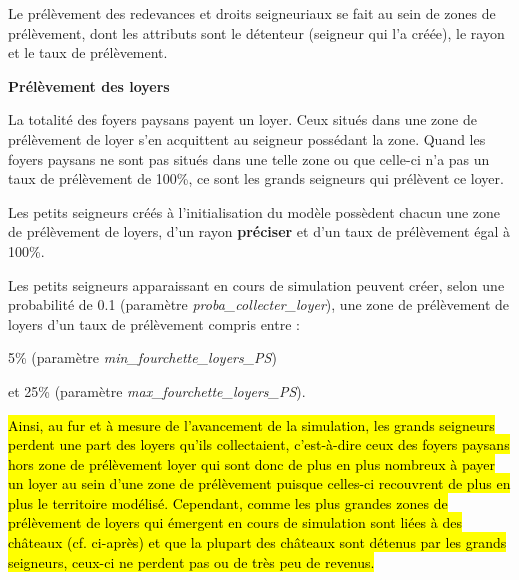 \documentclass[a4paper,11pt]{article}
\begin{document}
{Le prélèvement des redevances et droits seigneuriaux se fait au sein de zones de prélèvement, dont les attributs sont le détenteur (seigneur qui l'a créée), le rayon et le taux de prélèvement.

\bigskip
\textbf{Prélèvement des loyers}

La totalité des foyers paysans payent un loyer. Ceux situés dans une zone de prélèvement de loyer s'en acquittent au seigneur possédant la zone. Quand les foyers paysans ne sont pas situés dans une telle zone ou que celle-ci n'a pas un taux de prélèvement de 100\%, ce sont les grands seigneurs qui prélèvent ce loyer.

Les petits seigneurs créés à l'initialisation du modèle possèdent chacun une zone de prélèvement de loyers, d'un rayon \textbf{préciser} et d'un taux de prélèvement égal à 100\%.

Les petits seigneurs apparaissant en cours de simulation peuvent créer, selon une probabilité de 0.1 (paramètre \textit{proba\_collecter\_loyer}), une zone de prélèvement de loyers d'un taux de prélèvement compris entre :

5\% (paramètre \textit{min\_fourchette\_loyers\_PS})

et 25\% (paramètre \textit{max\_fourchette\_loyers\_PS}).

\hl{Ainsi, au fur et à mesure de l'avancement de la simulation, les grands seigneurs perdent une part des loyers qu'ils collectaient, c'est-à-dire ceux des foyers paysans hors zone de prélèvement loyer qui sont donc de plus en plus nombreux à payer un loyer au sein d'une zone de prélèvement puisque celles-ci recouvrent de plus en plus le territoire modélisé.
Cependant, comme les plus grandes zones de prélèvement de loyers qui émergent en cours de simulation sont liées à des châteaux (cf. ci-après) et que la plupart des châteaux sont détenus par les grands seigneurs, ceux-ci ne perdent pas ou de très peu de revenus.}


}
\end{document}
